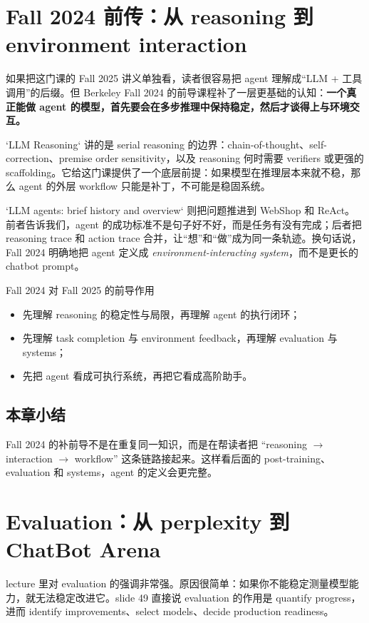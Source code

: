 \documentclass[a4paper]{article}
\begin{document}
\section{Fall 2024 前传：从 reasoning 到 environment interaction}
如果把这门课的 Fall 2025 讲义单独看，读者很容易把 agent 理解成“LLM + 工具调用”的后缀。但 Berkeley Fall 2024 的前导课程补了一层更基础的认知：\textbf{一个真正能做 agent 的模型，首先要会在多步推理中保持稳定，然后才谈得上与环境交互。}

`LLM Reasoning` 讲的是 serial reasoning 的边界：chain-of-thought、self-correction、premise order sensitivity，以及 reasoning 何时需要 verifiers 或更强的 scaffolding。它给这门课提供了一个底层前提：如果模型在推理层本来就不稳，那么 agent 的外层 workflow 只能是补丁，不可能是稳固系统。

`LLM agents: brief history and overview` 则把问题推进到 WebShop 和 ReAct。前者告诉我们，agent 的成功标准不是句子好不好，而是任务有没有完成；后者把 reasoning trace 和 action trace 合并，让“想”和“做”成为同一条轨迹。换句话说，Fall 2024 明确地把 agent 定义成 \emph{environment-interacting system}，而不是更长的 chatbot prompt。

\begin{importantbox}{Fall 2024 对 Fall 2025 的前导作用}
\begin{itemize}
    \item 先理解 reasoning 的稳定性与局限，再理解 agent 的执行闭环；
    \item 先理解 task completion 与 environment feedback，再理解 evaluation 与 systems；
    \item 先把 agent 看成可执行系统，再把它看成高阶助手。
\end{itemize}
\end{importantbox}

\subsection{本章小结}
Fall 2024 的补前导不是在重复同一知识，而是在帮读者把 “reasoning \(\rightarrow\) interaction \(\rightarrow\) workflow” 这条链路接起来。这样看后面的 post-training、evaluation 和 systems，agent 的定义会更完整。

\section{Evaluation：从 perplexity 到 ChatBot Arena}
lecture 里对 evaluation 的强调非常强。原因很简单：如果你不能稳定测量模型能力，就无法稳定改进它。slide 49 直接说 evaluation 的作用是 quantify progress，进而 identify improvements、select models、decide production readiness。
\end{document}
